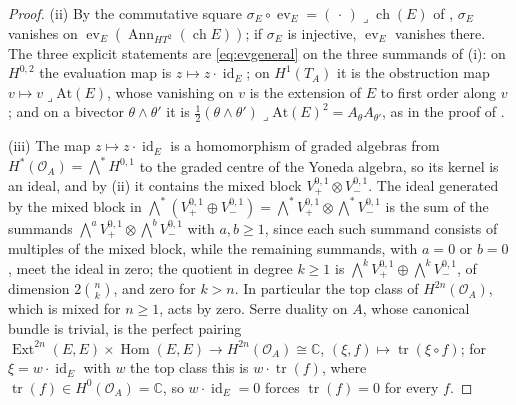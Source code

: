 \documentclass[11pt,reqno]{amsart}
\theoremstyle{plain}
\theoremstyle{definition}
\theoremstyle{remark}
\newcommand{\CC}{\mathbb{C}}
\newcommand{\cO}{\mathcal{O}}
\DeclareMathOperator{\ch}{ch}
\DeclareMathOperator{\Hom}{Hom}
\DeclareMathOperator{\Ext}{Ext}
\DeclareMathOperator{\id}{id}
\DeclareMathOperator{\Ann}{Ann}
\begin{document}
\begin{proof}
(ii) By the commutative square $\sigma_{E}\circ\operatorname{ev}_{E}
=(\,\cdot\,)\lrcorner\ch(E)$ of , $\sigma_{E}$
vanishes on $\operatorname{ev}_{E}(\Ann_{HT^{2}}(\ch E))$; if $\sigma_{E}$
is injective, $\operatorname{ev}_{E}$ vanishes there. The three explicit
statements are \eqref{eq:evgeneral} on the three summands of (i): on
$H^{0,2}$ the evaluation map is $z\mapsto z\cdot\id_{E}$; on $H^{1}(T_{A})$
it is the obstruction map $v\mapsto v\lrcorner\mathrm{At}(E)$, whose
vanishing on $v$ is the extension of $E$ to first order along $v$
\cite{Tod09}; and on a bivector $\theta\wedge\theta'$ it is
$\tfrac12(\theta\wedge\theta')\lrcorner\mathrm{At}(E)^{2}
=A_{\theta}A_{\theta'}$, as in the proof of .

(iii) The map $z\mapsto z\cdot\id_{E}$ is a homomorphism of graded algebras
from $H^{*}(\cO_{A})=\bigwedge^{*}H^{0,1}$ to the graded centre of the Yoneda
algebra, so its kernel is an ideal, and by (ii) it contains the mixed block
$V_{+}^{0,1}\otimes V_{-}^{0,1}$. The ideal generated by the mixed block in
$\bigwedge^{*}(V_{+}^{0,1}\oplus V_{-}^{0,1})
=\bigwedge^{*}V_{+}^{0,1}\otimes\bigwedge^{*}V_{-}^{0,1}$ is the sum of the
summands $\bigwedge^{a}V_{+}^{0,1}\otimes\bigwedge^{b}V_{-}^{0,1}$ with
$a,b\ge1$, since each such summand consists of multiples of the mixed block,
while the remaining summands, with $a=0$ or $b=0$, meet the ideal in zero; the
quotient in degree $k\ge1$ is $\bigwedge^{k}V_{+}^{0,1}\oplus\bigwedge^{k}V_{-}^{0,1}$,
of dimension $2\binom{n}{k}$, and zero for $k>n$. In particular the top class
of $H^{2n}(\cO_{A})$, which is mixed for $n\ge1$, acts by zero. Serre duality
on $A$, whose canonical bundle is trivial, is the perfect pairing
$\Ext^{2n}(E,E)\times\Hom(E,E)\to H^{2n}(\cO_{A})\cong\CC$,
$(\xi,f)\mapsto\operatorname{tr}(\xi\circ f)$; for $\xi=w\cdot\id_{E}$
with $w$ the top class this is $w\cdot\operatorname{tr}(f)$, where
$\operatorname{tr}(f)\in H^{0}(\cO_{A})=\CC$, so $w\cdot\id_{E}=0$ forces
$\operatorname{tr}(f)=0$ for every $f$.


\end{proof}
\end{document}
